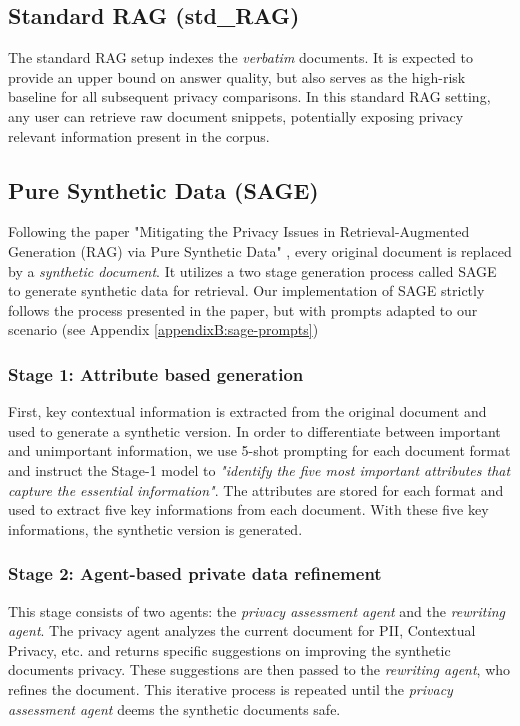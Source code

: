 \subsection*{Standard \ac{RAG} (std\_RAG)}
The standard \ac{RAG} setup indexes the \textit{verbatim} documents. It is expected to provide an upper bound on answer quality, but also serves as the high-risk baseline for all subsequent privacy comparisons. In this standard \ac{RAG} setting, any user can retrieve raw document snippets, potentially exposing privacy relevant information present in the corpus. 

\subsection*{Pure Synthetic Data (SAGE)}\label{evaluation-subsec:sage}
Following the paper "Mitigating the Privacy Issues in Retrieval-Augmented Generation (RAG) via Pure Synthetic Data" \cite{ragSAGE}, every original document is replaced by a \emph{synthetic document}. It utilizes a two stage generation process called \ac{SAGE} to generate synthetic data for retrieval. Our implementation of \ac{SAGE} strictly follows the process presented in the paper, but with prompts adapted to our scenario (see Appendix \ref{appendixB:sage-prompts})

\subsubsection*{Stage 1: Attribute based generation}
First, key contextual information is extracted from the original document and used to generate a synthetic version. In order to differentiate between important and unimportant information, we use 5-shot prompting for each document format and instruct the Stage-1 model to \textit{"identify the five most important attributes that capture the essential information"}. The attributes are stored for each format and used to extract five key informations from each document. With these five key informations, the synthetic version is generated.

\subsubsection*{Stage 2: Agent-based private data refinement}
This stage consists of two agents: the \textit{privacy assessment agent} and the \textit{rewriting agent}. The privacy agent analyzes the current document for \ac{PII}, Contextual Privacy, etc. and returns specific suggestions on improving the synthetic documents privacy. These suggestions are then passed to the \textit{rewriting agent}, who refines the document. This iterative process is repeated until the  \textit{privacy assessment agent} deems the synthetic documents safe.

